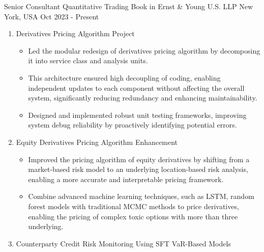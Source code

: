 

\begin{cventries}

  \cventry
    {Senior Consultant} %
    {Quantitative Trading Book in Ernst \& Young U.S. LLP} %
    {New York, USA} %
    {Oct 2023 - Present} %
    {
      \begin{enumerate}
        \item Derivatives Pricing Algorithm Project
        \begin{itemize}
          \item Led the modular redesign of derivatives pricing algorithm by decomposing it into service class and analysis units.
          \item This architecture ensured high decoupling of coding, enabling independent updates to each component without affecting the overall system, significantly reducing redundancy and enhancing maintainability.
          \item Designed and implemented robust unit testing frameworks, improving system debug reliability by proactively identifying potential errors.
        \end{itemize}
        \item Equity Derivatives Pricing Algorithm Enhancement
        \begin{itemize}
          \item Improved the pricing algorithm of equity derivatives by shifting from a market-based risk model to an underlying location-based risk analysis, enabling a more accurate and interpretable pricing framework.
          \item Combine advanced machine learning techniques, such as LSTM, random forest models with traditional MCMC methods to price derivatives, enabling the pricing of complex toxic options with more than three underlying.
        \end{itemize}
        \item Counterparty Credit Risk Monitoring Using SFT VaR-Based Models
        \begin{itemize}

\end{itemize}
\end{enumerate}}
\end{cventries}
